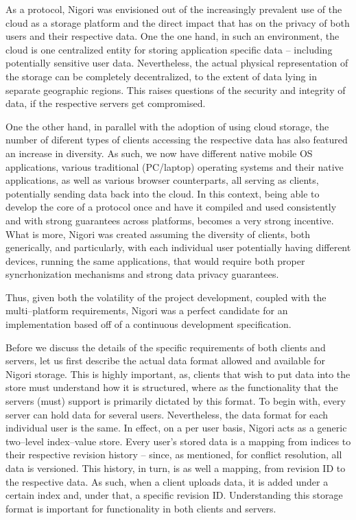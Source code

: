 As a protocol, Nigori was envisioned out of the increasingly prevalent use of the cloud as a storage platform and the direct impact that has on the privacy of both users and their respective data.
One the one hand, in such an environment, the cloud is one centralized entity for storing application specific data -- including potentially sensitive user data.
Nevertheless, the actual physical representation of the storage can be completely decentralized, to the extent of data lying in separate geographic regions.
This raises questions of the security and integrity of data, if the respective servers get compromised.

One the other hand, in parallel with the adoption of using cloud storage, the number of diferent types of clients accessing the respective data has also featured an increase in diversity.
As such, we now have different native mobile OS applications, various traditional (PC/laptop) operating systems and their native applications, as well as various browser counterparts, all serving as clients, potentially sending data back into the cloud.
In this context, being able to develop the core of a protocol once and have it compiled and used consistently and with strong guarantees across platforms, becomes a very strong incentive.
What is more, Nigori was created assuming the diversity of clients, both generically, and particularly, with each individual user potentially having different devices, running the same applications, that would require both proper syncrhonization mechanisms and strong data privacy guarantees.

Thus, given both the volatility of the project development, coupled with the multi--platform requirements, Nigori was a perfect candidate for an implementation based off of a continuous development specification.

Before we discuss the details of the specific requirements of both clients and servers, let us first describe the actual data format allowed and available for Nigori storage.
This is highly important, as, clients that wish to put data into the store must understand how it is structured, where as the functionality that the servers (must) support is primarily dictated by this format.
To begin with, every server can hold data for several users.
Nevertheless, the data format for each individual user is the same.
In effect, on a per user basis, Nigori acts as a generic two--level index--value store.
Every user's stored data is a mapping from indices to their respective revision history -- since, as mentioned, for conflict resolution, all data is versioned.
This history, in turn, is as well a mapping, from revision ID to the respective data.
As such, when a client uploads data, it is added under a certain index and, under that, a specific revision ID.
Understanding this storage format is important for functionality in both clients and servers.

